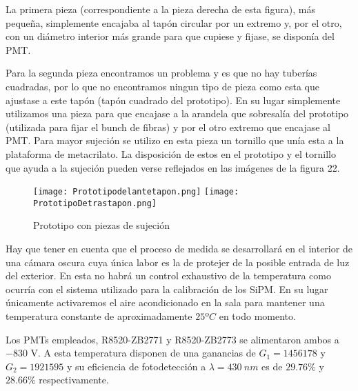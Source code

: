La primera pieza (correspondiente a la pieza derecha de esta figura), más pequeña, simplemente encajaba al tapón circular por un extremo y, por el otro, con un diámetro interior más grande para que cupiese y fijase, se disponía del PMT.

Para la segunda pieza encontramos un problema y es que no hay tuberías cuadradas, por lo que no encontramos ningun tipo de pieza como esta que ajustase a este tapón (tapón cuadrado del prototipo). En su lugar simplemente utilizamos una pieza para que encajase a la arandela que sobresalía del prototipo (utilizada para fijar el bunch de fibras) y por el otro extremo que encajase al PMT. Para mayor sujeción se utilizo en esta pieza un tornillo que unía esta a la plataforma de metacrilato. La disposición de estos en el prototipo y el tornillo que ayuda a la sujeción pueden verse reflejados en las imágenes de la figura 22.

\begin{figure}[htb]
\centering
{
\texttt{[image: Prototipodelantetapon.png]} 
}
{
\texttt{[image: PrototipoDetrastapon.png]} 
}
\caption{Prototipo con piezas de sujeción \label{prototipotapones}}
\end{figure} 

Hay que tener en cuenta que el proceso de medida se desarrollará en el interior de una cámara oscura cuya única labor es la de protejer de la posible entrada de luz del exterior. En esta no habrá un control exhaustivo de la temperatura como ocurría con el sistema utilizado para la calibración de los SiPM. En su lugar únicamente activaremos el aire acondicionado en la sala para mantener una temperatura constante de aproximadamente $25ºC$ en todo momento.

Los PMTs empleados, R8520-ZB2771 y R8520-ZB2773 se alimentaron ambos a $-830$ V. A esta temperatura disponen de una ganancias de $G_1=1456178$ y $G_2=1921595$ y su eficiencia de fotodetección a $\lambda=430~nm$ es de $29.76\%$ y $28.66\%$ respectivamente. 
